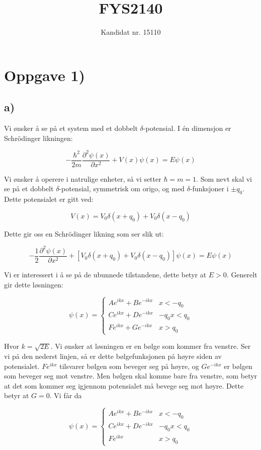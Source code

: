 \documentclass[a4paper,norsk, 10pt]{article}
\title{FYS2140}
\author{Kandidat nr. 15110}
\numberwithin{equation}{section}
\begin{document}
\maketitle

\section{Oppgave 1)}
\subsection*{a)}
Vi ønsker å se på et system med et dobbelt $\delta$-potensial. I én dimensjon er Schrödinger likningen:

$$
-\frac{\hbar^2}{2m}\frac{\partial^2 \psi(x)}{\partial x^2} + V(x)\psi(x) = E\psi(x)
$$

Vi ønsker å operere i natrulige enheter, så vi setter $\hbar = m = 1$. Som nevt skal vi se på et dobbelt $\delta$-potensial, symmetrisk om origo, og med $\delta$-funksjoner i $\pm q_0$. Dette potensialet er gitt ved:

$$
V(x) = V_0\delta(x+q_0) + V_0\delta(x-q_0)
$$

Dette gir oss en Schrödinger likning som ser slik ut:

\begin{equation}
-\frac{1}{2}\frac{\partial^2 \psi(x)}{\partial x^2} + \left[V_0\delta(x+q_0) + V_0\delta(x-q_0)\right]\psi(x) = E\psi(x)
\label{eq:deltaSchr}
\end{equation}

Vi er interessert i å se på de ubunnede tilstandene, dette betyr at $E>0$. Generelt gir dette løsningen:

$$
\psi(x) = 
\begin{cases}
Ae^{ikx} + Be^{-ikx} & x< -q_0 \\
Ce^{ikx} + De^{-ikx} & -q_0x< q_0 \\
Fe^{ikx} + Ge^{-ikx} & x>q_0 
\end{cases}
$$

Hvor $k = \sqrt{2E}$. Vi ønsker at løsningen er en bølge som kommer fra venstre. Ser vi på den nederst linjen, så er dette bølgefunksjonen på høyre siden av potensialet. $Fe^{ikx}$ tilsvarer bølgen som beveger seg på høyre, og $Ge^{-ikx}$ er bølgen som beveger seg mot venstre. Men bølgen skal komme bare fra venstre, som betyr at det som kommer seg igjennom potensialet må bevege seg mot høyre. Dette betyr at $G = 0$. Vi får da

\begin{equation}
\psi(x) = 
\begin{cases}
Ae^{ikx} + Be^{-ikx} & x< -q_0 \\
Ce^{ikx} + De^{-ikx} & -q_0x< q_0 \\
Fe^{ikx} & x>q_0 
\end{cases}
\label{eq:psi}
\end{equation}
\end{document}
